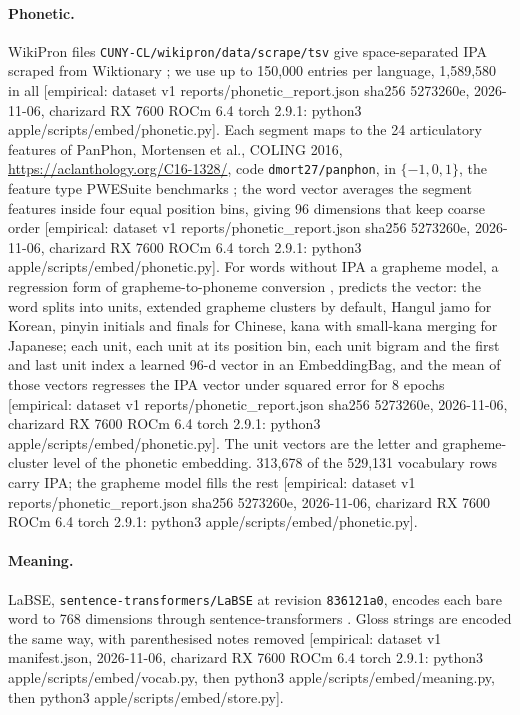 \documentclass[11pt]{article}
\newcommand{\tg}[1]{\textcolor{bucketgray}{\footnotesize #1}}
\begin{document}
\paragraph{Phonetic.} WikiPron files \texttt{CUNY-CL/wikipron/data/scrape/tsv} give space-separated IPA scraped from Wiktionary \cite{gorman2020sigmorphon,wikipa2026}; we use up to 150,000 entries per language, 1,589,580 in all \tg{[empirical: dataset v1 reports/phonetic\_report.json sha256 5273260e, 2026-11-06, charizard RX 7600 ROCm 6.4 torch 2.9.1: python3 apple/scripts/embed/phonetic.py]}. Each segment maps to the 24 articulatory features of PanPhon, Mortensen et al., COLING 2016, \url{https://aclanthology.org/C16-1328/}, code \texttt{dmort27/panphon}, in $\{-1,0,1\}$, the feature type PWESuite benchmarks \cite{zouhar2023pwesuite}; the word vector averages the segment features inside four equal position bins, giving 96 dimensions that keep coarse order \tg{[empirical: dataset v1 reports/phonetic\_report.json sha256 5273260e, 2026-11-06, charizard RX 7600 ROCm 6.4 torch 2.9.1: python3 apple/scripts/embed/phonetic.py]}. For words without IPA a grapheme model, a regression form of grapheme-to-phoneme conversion \cite{gorman2020sigmorphon}, predicts the vector: the word splits into units, extended grapheme clusters by default, Hangul jamo for Korean, pinyin initials and finals for Chinese, kana with small-kana merging for Japanese; each unit, each unit at its position bin, each unit bigram and the first and last unit index a learned 96-d vector in an EmbeddingBag, and the mean of those vectors regresses the IPA vector under squared error for 8 epochs \tg{[empirical: dataset v1 reports/phonetic\_report.json sha256 5273260e, 2026-11-06, charizard RX 7600 ROCm 6.4 torch 2.9.1: python3 apple/scripts/embed/phonetic.py]}. The unit vectors are the letter and grapheme-cluster level of the phonetic embedding. 313,678 of the 529,131 vocabulary rows carry IPA; the grapheme model fills the rest \tg{[empirical: dataset v1 reports/phonetic\_report.json sha256 5273260e, 2026-11-06, charizard RX 7600 ROCm 6.4 torch 2.9.1: python3 apple/scripts/embed/phonetic.py]}.

\paragraph{Meaning.} LaBSE, \texttt{sentence-transformers/LaBSE} at revision \texttt{836121a0}, encodes each bare word to 768 dimensions through sentence-transformers \cite{feng2020labse,reimers2019sbert}. Gloss strings are encoded the same way, with parenthesised notes removed \tg{[empirical: dataset v1 manifest.json, 2026-11-06, charizard RX 7600 ROCm 6.4 torch 2.9.1: python3 apple/scripts/embed/vocab.py, then python3 apple/scripts/embed/meaning.py, then python3 apple/scripts/embed/store.py]}.
\end{document}
